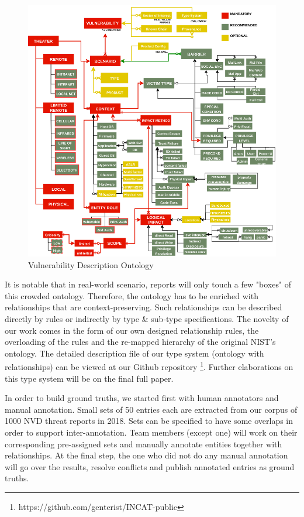 \documentclass{article} %
\begin{document}
\begin{figure}[h]
  \centering
  \includegraphics[width=12cm]{images/NISTIR8138.png}
  \caption{Vulnerability Description Ontology}
  \label{Figure:VulOntology}
\end{figure}

It is notable that in real-world scenario, reports will only touch a few "boxes" of this crowded ontology. Therefore, the ontology has to be enriched with relationships that are context-preserving. Such relationships can be described directly by rules or indirectly by type \& sub-type specifications. The novelty of our work comes in the form of our own designed relationship rules, the overloading of the rules and the re-mapped hierarchy of the original NIST's ontology. The detailed description file of our type system (ontology with relationships) can be viewed at our Github repository \footnote{https://github.com/genterist/INCAT-public}. Further elaborations on this type system will be on the final full paper.

In order to build ground truths, we started first with human annotators and manual annotation. Small sets of 50 entries each are extracted from our corpus of 1000 NVD threat reports in 2018. Sets can be specified to have some overlaps in order to support inter-annotation. Team members (except one) will work on their corresponding pre-assigned sets and manually annotate entities together with relationships. At the final step, the one who did not do any manual annotation will go over the results, resolve conflicts and publish annotated entries as ground truths.
\end{document}
